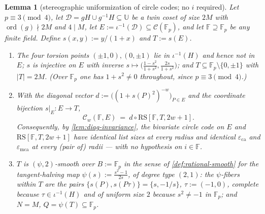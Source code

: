 \documentclass[11pt]{article}
\newtheorem{lemma}[theorem]{Lemma}
\theoremstyle{definition}
\theoremstyle{remark}
\newcommand{\F}{\mathbb{F}}
\newcommand{\B}{B}
\newcommand{\RS}{\mathrm{RS}}
\newcommand{\eca}{\varepsilon_{\mathrm{ca}}}
\newcommand{\emca}{\varepsilon_{\mathrm{mca}}}
\newcommand{\UU}{\mathbb{U}}
\begin{document}
\begin{lemma}[stereographic uniformization of circle codes; no $i$ required]\label{lem:stereographic}
Let $p\equiv3\pmod4$, let $\mathcal D=gH\cup g^{-1}H\subseteq\UU$ be a twin coset of size $2M$ with $\operatorname{ord}(g)\nmid2M$ and $4\mid M$, let $E:=\iota^{-1}(\mathcal D)\subseteq\mathcal C(\F_p)$, and let $\F\supseteq\F_p$ be \emph{any} finite field. Define $s(x,y):=y/(1+x)$ and $T:=s(E)$.
\begin{enumerate}[label=\textup{(\roman*)}]
\item The four torsion points $(\pm1,0),(0,\pm1)$ lie in $\iota^{-1}(H)$ and hence not in $E$; $s$ is injective on $E$ with inverse $s\mapsto\bigl(\frac{1-s^2}{1+s^2},\frac{2s}{1+s^2}\bigr)$; and $T\subseteq\F_p\setminus\{0,\pm1\}$ with $|T|=2M$. \textup(Over $\F_p$ one has $1+s^2\ne0$ throughout, since $p\equiv3\pmod4$.\textup)
\item With the diagonal vector $d:=\bigl((1+s(P)^2)^{-w}\bigr)_{P\in E}$ and the coordinate bijection $s|_E:E\to T$,
\[
\mathcal C_w(\F,E)\ =\ d\circ\RS[\F,T,2w+1].
\]
Consequently, by \cref{lem:diag-invariance}, the bivariate circle code on $E$ and $\RS[\F,T,2w+1]$ have identical list sizes at every radius and identical $\eca$ and $\emca$ at every \textup(pair of\textup) radii --- with no hypothesis on $i\in\F$.
\item $T$ is $(\psi,2)$-smooth over $\B:=\F_p$ in the sense of \cref{def:rational-smooth} for the tangent-halving map $\psi(s):=\frac{s^2-1}{2s}$, of degree type $(2,1)$: the $\psi$-fibers within $T$ are the pairs $\{s(P),s(P\tau)\}=\{s,-1/s\}$, $\tau:=(-1,0)$, complete because $\tau\in\iota^{-1}(H)$ and of uniform size $2$ because $s^2\ne-1$ in $\F_p$; and $N=M$, $Q=\psi(T)\subseteq\F_p$.
\end{enumerate}
\end{lemma}
\end{document}
